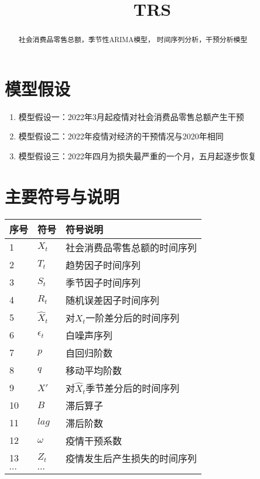 \documentclass[12pt,a4paper]{nmmcm}
\title{TRS}
\date{}
\newcommand{\headcol}{\rowcolor{tableheadcolor}}
\begin{document}
\begin{abstract}


\begin{keywords}
{\song\xiaosihao
社会消费品零售总额，季节性ARIMA模型， 时间序列分析，干预分析模型}
\end{keywords}


\end{abstract}
\maketitle
\renewcommand{\contentsname}{\centerline{\sanhao\bfseries\HEI 目\quad 录}}
\tableofcontents


\newpage
\setcounter{page}{1}
\pagestyle{fancy}
\song\xiaosihao


\section{模型假设}
\begin{enumerate}
  \item 模型假设一：2022年3月起疫情对社会消费品零售总额产生干预
  \item 模型假设二：2022年疫情对经济的干预情况与2020年相同
  \item 模型假设三：2022年四月为损失最严重的一个月，五月起逐步恢复
\end{enumerate}

\section{主要符号与说明}

\begin{table}[h!]
  \centering
  \small
  \begin{tabular}{p{60pt}<{\centering}|p{60pt}<{\centering}p{180pt}<{\raggedright}}
   \hline
   \headcol 序号 & 符号 & 符号说明 \\
   \hline
    1 & $X_t$ & 社会消费品零售总额的时间序列 \\
    2 & $T_t$ & 趋势因子时间序列 \\
    3 & $S_t$ & 季节因子时间序列 \\
    4 & $R_t$ & 随机误差因子时间序列 \\
    5 & $\hat{X}_t$ & 对\(X_t\)一阶差分后的时间序列 \\
    6 & $\epsilon_t$ & 白噪声序列 \\
    7 & $p$ & 自回归阶数 \\
    8 & $q$ & 移动平均阶数 \\
    9 & $X'$ & 对\(\hat{X}_t\)季节差分后的时间序列 \\
    10 & $B$ & 滞后算子 \\
    11 & $lag$ & 滞后阶数 \\
    12 & $\omega$ & 疫情干预系数 \\
    13 & $Z_t$ & 疫情发生后产生损失的时间序列 \\
    $\cdots$ & $\cdots$\\
    \hline
  \end{tabular}
  \label{symbol}
\end{table}
\end{document}
